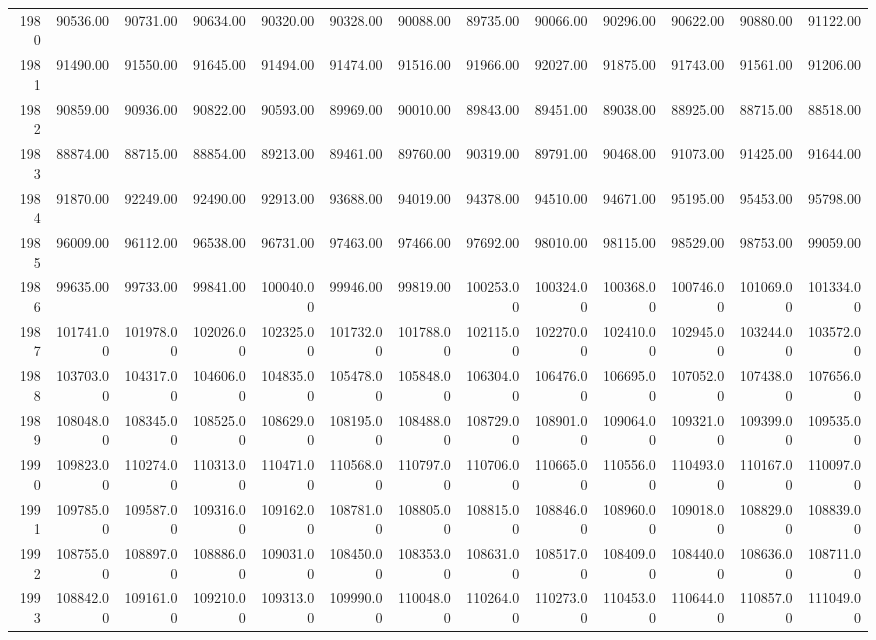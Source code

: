 \begin{longtable}{rrrrrrrrrrrrr}
  1980 & 90536.00 & 90731.00 & 90634.00 & 90320.00 & 90328.00 & 90088.00 & 89735.00 & 90066.00 & 90296.00 & 90622.00 & 90880.00 & 91122.00 \\ 
  1981 & 91490.00 & 91550.00 & 91645.00 & 91494.00 & 91474.00 & 91516.00 & 91966.00 & 92027.00 & 91875.00 & 91743.00 & 91561.00 & 91206.00 \\ 
  1982 & 90859.00 & 90936.00 & 90822.00 & 90593.00 & 89969.00 & 90010.00 & 89843.00 & 89451.00 & 89038.00 & 88925.00 & 88715.00 & 88518.00 \\ 
  1983 & 88874.00 & 88715.00 & 88854.00 & 89213.00 & 89461.00 & 89760.00 & 90319.00 & 89791.00 & 90468.00 & 91073.00 & 91425.00 & 91644.00 \\ 
  1984 & 91870.00 & 92249.00 & 92490.00 & 92913.00 & 93688.00 & 94019.00 & 94378.00 & 94510.00 & 94671.00 & 95195.00 & 95453.00 & 95798.00 \\ 
  1985 & 96009.00 & 96112.00 & 96538.00 & 96731.00 & 97463.00 & 97466.00 & 97692.00 & 98010.00 & 98115.00 & 98529.00 & 98753.00 & 99059.00 \\ 
  1986 & 99635.00 & 99733.00 & 99841.00 & 100040.00 & 99946.00 & 99819.00 & 100253.00 & 100324.00 & 100368.00 & 100746.00 & 101069.00 & 101334.00 \\ 
  1987 & 101741.00 & 101978.00 & 102026.00 & 102325.00 & 101732.00 & 101788.00 & 102115.00 & 102270.00 & 102410.00 & 102945.00 & 103244.00 & 103572.00 \\ 
  1988 & 103703.00 & 104317.00 & 104606.00 & 104835.00 & 105478.00 & 105848.00 & 106304.00 & 106476.00 & 106695.00 & 107052.00 & 107438.00 & 107656.00 \\ 
  1989 & 108048.00 & 108345.00 & 108525.00 & 108629.00 & 108195.00 & 108488.00 & 108729.00 & 108901.00 & 109064.00 & 109321.00 & 109399.00 & 109535.00 \\ 
  1990 & 109823.00 & 110274.00 & 110313.00 & 110471.00 & 110568.00 & 110797.00 & 110706.00 & 110665.00 & 110556.00 & 110493.00 & 110167.00 & 110097.00 \\ 
  1991 & 109785.00 & 109587.00 & 109316.00 & 109162.00 & 108781.00 & 108805.00 & 108815.00 & 108846.00 & 108960.00 & 109018.00 & 108829.00 & 108839.00 \\ 
  1992 & 108755.00 & 108897.00 & 108886.00 & 109031.00 & 108450.00 & 108353.00 & 108631.00 & 108517.00 & 108409.00 & 108440.00 & 108636.00 & 108711.00 \\ 
  1993 & 108842.00 & 109161.00 & 109210.00 & 109313.00 & 109990.00 & 110048.00 & 110264.00 & 110273.00 & 110453.00 & 110644.00 & 110857.00 & 111049.00 \\ 

\end{longtable}
